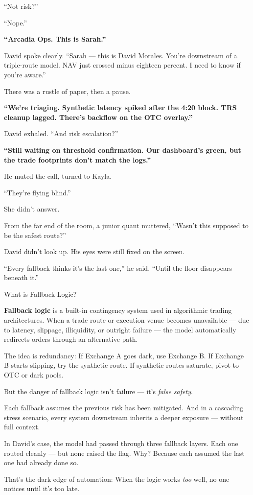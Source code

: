 “Not risk?”

“Nope.”

\textbf{“Arcadia Ops. This is Sarah.”}

David spoke clearly. “Sarah — this is David Morales. You’re downstream of a triple-route model. NAV just crossed 
minus eighteen percent. I need to know if you’re aware.”

There was a rustle of paper, then a pause.

\textbf{“We’re triaging. Synthetic latency spiked after the 4:20 block. TRS cleanup lagged. There’s backflow 
on the OTC overlay.”}

David exhaled. “And risk escalation?”

\textbf{“Still waiting on threshold confirmation. Our dashboard’s green, but the trade footprints 
don’t match the logs.”}

He muted the call, turned to Kayla.

“They’re flying blind.”

She didn’t answer.

From the far end of the room, a junior quant muttered, “Wasn’t this supposed to be the safest route?”

David didn’t look up. His eyes were still fixed on the screen.

“Every fallback thinks it’s the last one,” he said. “Until the floor disappears beneath it.”

\medskip

\begin{TechnicalSidebar}{What is Fallback Logic?}

  \textbf{Fallback logic} is a built-in contingency system used in algorithmic trading architectures.  
  When a trade route or execution venue becomes unavailable — due to latency, slippage, illiquidity, or outright failure —  
  the model automatically redirects orders through an alternative path.

  \medskip

  The idea is redundancy:  
  If Exchange A goes dark, use Exchange B.  
  If Exchange B starts slipping, try the synthetic route.  
  If synthetic routes saturate, pivot to OTC or dark pools.

  \medskip

  But the danger of fallback logic isn’t failure — it’s \textit{false safety}.

  \medskip

  Each fallback assumes the previous risk has been mitigated.  
  And in a cascading stress scenario, every system downstream inherits a deeper exposure — without full context.  

  \medskip

  In David’s case, the model had passed through three fallback layers.  
  Each one routed cleanly — but none raised the flag.  
  Why? Because each assumed the last one had already done so.

  \medskip

  That’s the dark edge of automation:  
  When the logic works \textit{too} well, no one notices until it’s too late.

\end{TechnicalSidebar}


